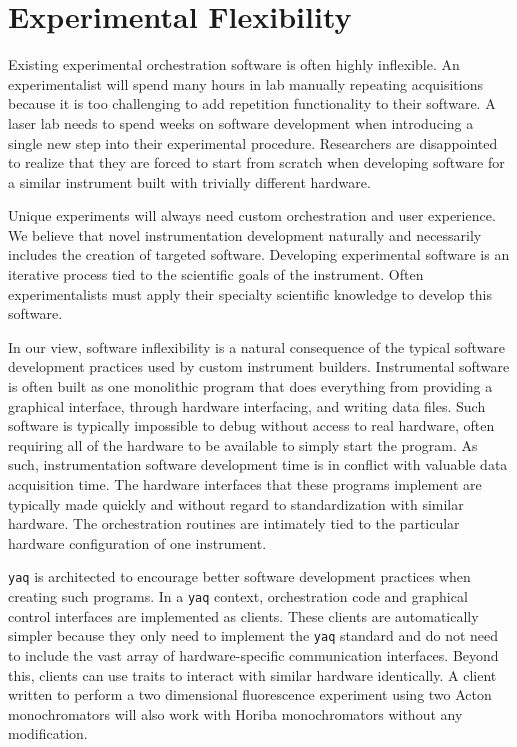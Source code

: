 \documentclass[aip, amsmath, amssymb, reprint,]{revtex4-2}
\newcommand\yaq{\texttt{yaq}}
\begin{document}
\section{Experimental Flexibility}

Existing experimental orchestration software is often highly inflexible.
An experimentalist will spend many hours in lab manually repeating acquisitions because it is too challenging to add repetition functionality to their software.
A laser lab needs to spend weeks on software development when introducing a single new step into their experimental procedure.
Researchers are disappointed to realize that they are forced to start from scratch when developing software for a similar instrument built with trivially different hardware.

Unique experiments will always need custom orchestration and user experience.
We believe that novel instrumentation development naturally and necessarily includes the creation of targeted software.
Developing experimental software is an iterative process tied to the scientific goals of the instrument.
Often experimentalists must apply their specialty scientific knowledge to develop this software.\cite{SegalJudith2005a} %

In our view, software inflexibility is a natural consequence of the typical software development practices used by custom instrument builders.
Instrumental software is often built as one monolithic program that does everything from providing a graphical interface, through hardware interfacing, and writing data files.
Such software is typically impossible to debug without access to real hardware, often requiring all of the hardware to be available to simply start the program.
As such, instrumentation software development time is in conflict with valuable data acquisition time.
The hardware interfaces that these programs implement are typically made quickly and without regard to standardization with similar hardware.
The orchestration routines are intimately tied to the particular hardware configuration of one instrument.

\yaq{} is architected to encourage better software development practices when creating such programs.
In a \yaq{} context, orchestration code and graphical control interfaces are implemented as clients.
These clients are automatically simpler because they only need to implement the \yaq{} standard and do not need to include the vast array of hardware-specific communication interfaces.
Beyond this, clients can use traits to interact with similar hardware identically.
A client written to perform a two dimensional fluorescence experiment using two Acton monochromators will also work with Horiba monochromators without any modification.
\end{document}
